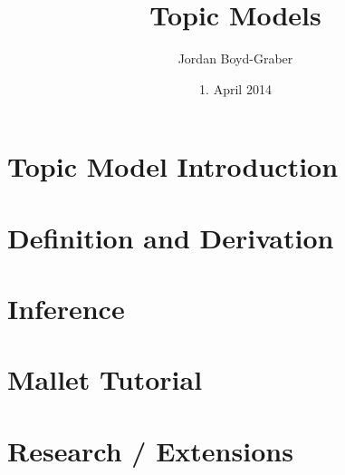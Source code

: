 \documentclass[compress]{beamer}
\title{Topic Models}
\author{Jordan Boyd-Graber}
\date{1. April 2014}
\begin{document}

\section{Topic Model Introduction}



\section{Definition and Derivation}



\section{Inference}



\section{Mallet Tutorial}



\section{Research / Extensions}



\end{document}
